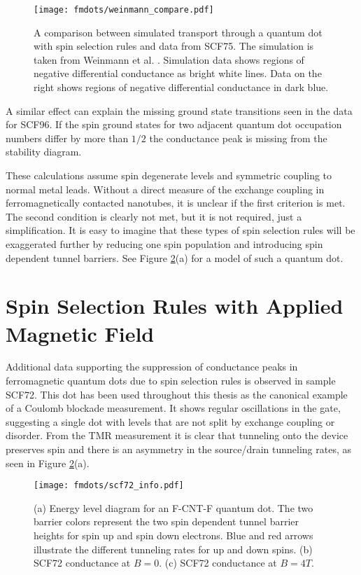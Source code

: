 \begin{figure}
    \centering
    \texttt{[image: fmdots/weinmann\_compare.pdf]}
    \caption{A comparison between simulated transport through a quantum dot with spin selection rules and data from SCF75. The simulation is taken from Weinmann et al. \cite{Weinmann1995}. Simulation data shows regions of negative differential conductance as bright white lines. Data on the right shows regions of negative differential conductance in dark blue.}
    \label{fig:weinmann_compare}
\end{figure}

A similar effect can explain the missing ground state transitions seen in the data for SCF96. If the spin ground states for two adjacent quantum dot occupation numbers differ by more than $1/2$ the conductance peak is missing from the stability diagram.

These calculations assume spin degenerate levels and symmetric coupling to normal metal leads. Without a direct measure of the exchange coupling in ferromagnetically contacted nanotubes, it is unclear if the first criterion is met. The second condition is clearly not met, but it is not required, just a simplification. It is easy to imagine that these types of spin selection rules will be exaggerated further by reducing one spin population and introducing spin dependent tunnel barriers. See Figure \ref{fig:scf72_info}(a) for a model of such a quantum dot.

\section{Spin Selection Rules with Applied Magnetic Field}
\label{sec:spin_selection_field}

Additional data supporting the suppression of conductance peaks in ferromagnetic quantum dots due to spin selection rules is observed in sample SCF72. This dot has been used throughout this thesis as the canonical example of a Coulomb blockade measurement. It shows regular oscillations in the gate, suggesting a single dot with levels that are not split by exchange coupling or disorder.  From the TMR measurement it is clear that tunneling onto the device preserves spin and there is an asymmetry in the source/drain tunneling rates, as seen in Figure \ref{fig:scf72_info}(a).  

\begin{figure}
    \centering
    \texttt{[image: fmdots/scf72\_info.pdf]}
    \caption{(a) Energy level diagram for an F-CNT-F quantum dot. The two barrier colors represent the two spin dependent tunnel barrier heights for spin up and spin down electrons. Blue and red arrows illustrate the different tunneling rates for up and down spins. (b) SCF72 conductance at $B=0$. (c) SCF72 conductance at $B=4T$.}
    \label{fig:scf72_info}
\end{figure}

